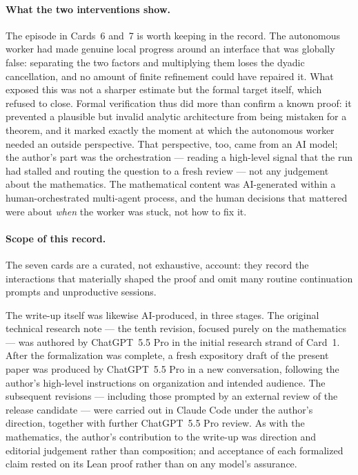 \documentclass[11pt]{article}
\theoremstyle{definition}
\theoremstyle{remark}
\begin{document}
\paragraph{What the two interventions show.}
The episode in Cards~6 and~7 is worth keeping in the record.  The autonomous
worker had made genuine local progress around an interface that was globally
false: separating the two factors and multiplying them loses the dyadic
cancellation, and no amount of finite refinement could have repaired it.  What
exposed this was not a sharper estimate but the formal target itself, which
refused to close.  Formal verification thus did more than confirm a known proof:
it prevented a plausible but invalid analytic architecture from being mistaken
for a theorem, and it marked exactly the moment at which the autonomous worker
needed an outside perspective.  That perspective, too, came from an AI model; the
author's part was the orchestration --- reading a high-level signal that the run
had stalled and routing the question to a fresh review --- not any judgement
about the mathematics.  The mathematical content was AI-generated within a
human-orchestrated multi-agent process, and the human decisions that mattered
were about \emph{when} the worker was stuck, not how to fix it.

\paragraph{Scope of this record.}
The seven cards are a curated, not exhaustive, account: they record the
interactions that materially shaped the proof and omit many routine continuation
prompts and unproductive sessions.

The write-up itself was likewise AI-produced, in three stages.  The original
technical research note --- the tenth revision, focused purely on the
mathematics --- was authored by ChatGPT~5.5 Pro in the initial research strand of
Card~1.  After the formalization was complete, a fresh expository draft of the
present paper was produced by ChatGPT~5.5 Pro in a new conversation, following
the author's high-level instructions on organization and intended audience.  The
subsequent revisions --- including those prompted by an external review of the
release candidate --- were carried out in Claude Code under the author's
direction, together with further ChatGPT~5.5 Pro review.  As with the
mathematics, the author's contribution to the write-up was direction and
editorial judgement rather than composition; and acceptance of each formalized
claim rested on its Lean proof rather than on any model's assurance.
\end{document}

